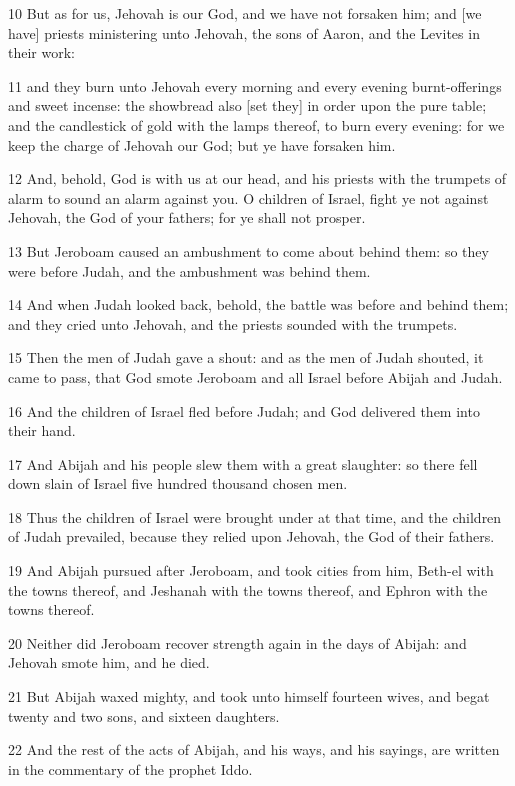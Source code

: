 \par 10 But as for us, Jehovah is our God, and we have not forsaken him; and [we have] priests ministering unto Jehovah, the sons of Aaron, and the Levites in their work:
\par 11 and they burn unto Jehovah every morning and every evening burnt-offerings and sweet incense: the showbread also [set they] in order upon the pure table; and the candlestick of gold with the lamps thereof, to burn every evening: for we keep the charge of Jehovah our God; but ye have forsaken him.
\par 12 And, behold, God is with us at our head, and his priests with the trumpets of alarm to sound an alarm against you. O children of Israel, fight ye not against Jehovah, the God of your fathers; for ye shall not prosper.
\par 13 But Jeroboam caused an ambushment to come about behind them: so they were before Judah, and the ambushment was behind them.
\par 14 And when Judah looked back, behold, the battle was before and behind them; and they cried unto Jehovah, and the priests sounded with the trumpets.
\par 15 Then the men of Judah gave a shout: and as the men of Judah shouted, it came to pass, that God smote Jeroboam and all Israel before Abijah and Judah.
\par 16 And the children of Israel fled before Judah; and God delivered them into their hand.
\par 17 And Abijah and his people slew them with a great slaughter: so there fell down slain of Israel five hundred thousand chosen men.
\par 18 Thus the children of Israel were brought under at that time, and the children of Judah prevailed, because they relied upon Jehovah, the God of their fathers.
\par 19 And Abijah pursued after Jeroboam, and took cities from him, Beth-el with the towns thereof, and Jeshanah with the towns thereof, and Ephron with the towns thereof.
\par 20 Neither did Jeroboam recover strength again in the days of Abijah: and Jehovah smote him, and he died.
\par 21 But Abijah waxed mighty, and took unto himself fourteen wives, and begat twenty and two sons, and sixteen daughters.
\par 22 And the rest of the acts of Abijah, and his ways, and his sayings, are written in the commentary of the prophet Iddo.

